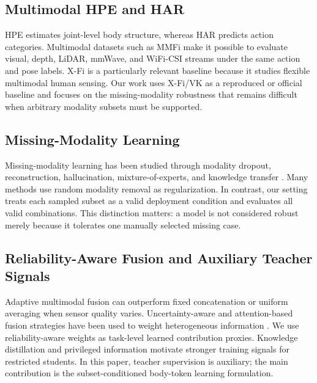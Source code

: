 ﻿\documentclass[journal]{IEEEtran}
\begin{document}
\subsection{Multimodal HPE and HAR}
HPE estimates joint-level body structure, whereas HAR predicts action categories. Multimodal datasets such as MMFi \cite{mmfi} make it possible to evaluate visual, depth, LiDAR, mmWave, and WiFi-CSI streams under the same action and pose labels. X-Fi \cite{xfi} is a particularly relevant baseline because it studies flexible multimodal human sensing. Our work uses X-Fi/VK as a reproduced or official baseline and focuses on the missing-modality robustness that remains difficult when arbitrary modality subsets must be supported.

\subsection{Missing-Modality Learning}
Missing-modality learning has been studied through modality dropout, reconstruction, hallucination, mixture-of-experts, and knowledge transfer \cite{missing}. Many methods use random modality removal as regularization. In contrast, our setting treats each sampled subset as a valid deployment condition and evaluates all valid combinations. This distinction matters: a model is not considered robust merely because it tolerates one manually selected missing case.

\subsection{Reliability-Aware Fusion and Auxiliary Teacher Signals}
Adaptive multimodal fusion can outperform fixed concatenation or uniform averaging when sensor quality varies. Uncertainty-aware and attention-based fusion strategies have been used to weight heterogeneous information \cite{kendall2017,transformer}. We use reliability-aware weights as task-level learned contribution proxies. Knowledge distillation \cite{hinton2015,fitnets} and privileged information \cite{vapnik2009} motivate stronger training signals for restricted students. In this paper, teacher supervision is auxiliary; the main contribution is the subset-conditioned body-token learning formulation.
\end{document}

